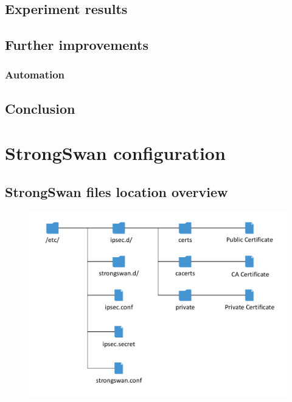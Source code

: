 \documentclass[a4paper]{report}
\begin{document}

\section{Experiment results}
\label{sec:ExpRes}

\section{Further improvements}
\subsection{Automation}

\section{Conclusion}
\label{sec:Conc}

\appendix

\chapter{StrongSwan configuration}
\label{app-ch:StrongSwan}

\section{StrongSwan files location overview}
\begin{figure}[h!]
	\label{fig:StrongSwanFiles}
	\includegraphics[keepaspectratio,width=\textwidth]{StrongSwan_Files.pdf}
\end{figure}
\end{document}
